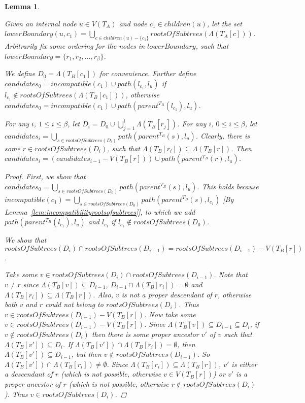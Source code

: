 \documentclass{article}
\newcommand{\leafset}{\Lambda}
\newtheorem{incompatiblecandidates}[incompatibility]{Lemma}
\begin{document}
    \begin{incompatiblecandidates}
        \label{lem:incompatiblecandidates}

        Given an internal node $u \in V(T_A)$ and node $c_1 \in children(u)$, let the set $lowerBoundary(u, c_1) = \bigcup_{c \in children(u) - \{c_1\}} rootsOfSubtrees(\leafset(T_A[c]))$. Arbitrarily fix some ordering for the nodes in $lowerBoundary$, such that $lowerBoundary = \{r_1, r_2, ..., r_{\beta}\}$.

        We define $D_0 = \leafset(T_B[c_1])$ for convenience. Further define $candidates_0 = incompatible(c_1) \cup path(l_{c_1}, l_u)$ if $l_{c_1} \not\in rootsOfSubtrees(\leafset(T_B[c_1]))$, otherwise $candidates_0 = incompatible(c_1) \cup path(parent^{T_B}(l_{c_1}), l_u)$.

        For any $i$, $1 \leq i \leq \beta$, let $D_i = D_0 \cup \bigcup_{j = 1}^{i} \leafset(T_B[r_j])$. For any $i$, $0 \leq i \leq \beta$, let $candidates_i = \bigcup_{s \in rootsOfSubtrees(D_i)} path(parent^{T_B}(s), l_u)$. Clearly, there is some $r \in rootsOfSubtrees(D_i)$, such that $\leafset(T_B[r_i]) \subseteq \leafset(T_B[r])$. Then $candidates_i = (candidates_{i-1} - V(T_B[r])) \cup path(parent^{T_B}(r), l_u)$.

        \begin{proof}
            First, we show that $candidates_0 = \bigcup_{s \in rootsOfSubtrees(D_0)} path(parent^{T_B}(s), l_u)$. This holds because $incompatible(c_1) = \bigcup_{s \in rootsOfSubtrees(D_0)} path(parent^{T_B}(s), l_{c_1})$ [By Lemma~\ref{lem:incompatibilityrootsofsubtrees}], to which we add $path(parent^{T_B}(l_{c_1}), l_u)$ and $l_{c_1}$ if $l_{c_1} \not\in rootsOfSubtrees(D_0)$.

            We show that $rootsOfSubtrees(D_i) \cap rootsOfSubtrees(D_{i-1}) = rootsOfSubtrees(D_{i-1}) - V(T_B[r])$.

            Take some $v \in rootsOfSubtrees(D_i) \cap rootsOfSubtrees(D_{i-1})$. Note that $v \neq r$ since $\leafset(T_B[v]) \subseteq D_{i-1}$, $D_{i-1} \cap \leafset(T_B[r_i]) = \emptyset$ and $\leafset(T_B[r_i]) \subseteq \leafset(T_B[r])$. Also, $v$ is not a proper descendant of $r$, otherwise both $v$ and $r$ could not belong to $rootsOfSubtrees(D_i)$. Thus $v \in rootsOfSubtrees(D_{i-1}) - V(T_B[r])$. Now take some $v \in rootsOfSubtrees(D_{i-1}) - V(T_B[r])$. Since $\leafset(T_B[v]) \subseteq D_{i-1} \subseteq D_i$, if $v \not\in rootsOfSubtrees(D_i)$ then there is some proper ancestor $v'$ of $v$ such that $\leafset(T_B[v']) \subseteq D_i$. If $\leafset(T_B[v']) \cap \leafset(T_B[r_i]) = \emptyset$, then $\leafset(T_B[v']) \subseteq D_{i-1}$, but then $v \not\in rootsOfSubtrees(D_{i-1})$. So $\leafset(T_B[v']) \cap \leafset(T_B[r_i]) \neq \emptyset$. Since $\leafset(T_B[r_i]) \subseteq \leafset(T_B[r])$, $v'$ is either a descendant of $r$ (which is not possible, otherwise $v \in V(T_B[r])$) or $v'$ is a proper ancestor of $r$ (which is not possible, otherwise $r \not\in rootsOfSubtrees(D_i)$). Thus $v \in rootsOfSubtrees(D_i)$.


\end{proof}
\end{incompatiblecandidates}
\end{document}
